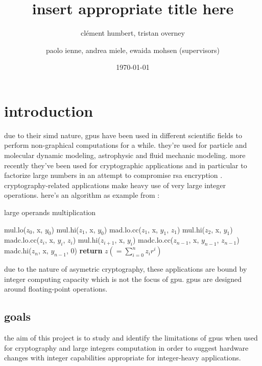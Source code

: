 \documentclass{report}
\begin{document}
\title{insert appropriate title here}
\author{cl\'{e}ment humbert, tristan overney\and paolo ienne, andrea miele, ewaida mohsen (supervisors)}
\date{\today}
\maketitle

\nocite{*}

\setcounter{tocdepth}{1}
\tableofcontents
\listoffigures

\chapter{introduction}

    due to their simd nature, gpus have been used in different scientific fields to perform
    non-graphical computations for a while. they're used for particle and molecular dynamic 
    modeling, astrophysic and fluid mechanic modeling.
    more recently they've been used for cryptographic applications and in particular
    to factorize large numbers in an attempt to compromise rsa encryption \cite{cofact14}.
    cryptography-related applications make heavy use of very large integer operations.
    here's an algorithm as example from \cite{cofact14}:
    \begin{algorithm}
    \caption{large operands multiplication}\label{mulalgo}
    \begin{algorithmic}[1]
        \state mul.lo($z_0$, x, $y_0$)
        \state mul.hi($z_1$, x, $y_0$)
        \state mad.lo.cc($z_1$, x, $y_1$, $z_1$)
        \state mul.hi($z_2$, x, $y_1$)
            \state madc.lo.cc($z_i$, x, $y_i$, $z_i$)
            \state mul.hi($z_{i+1}$, x, $y_i$)
        \endfor
        \state madc.lo.cc($z_{n-1}$, x, $y_{n-1}$, $z_{n-1}$)
        \state madc.hi($z_n$, x, $y_{n-1}$, 0)
        \state \textbf{return} $z (=\sum_{i=0}^nz_ir^i)$
    \end{algorithmic}
    \end{algorithm}

    due to the nature of asymetric cryptography, these applications are bound by
    integer computing capacity which is not the focus of gpu. gpus are designed
    around floating-point operations.

\section{goals}
    the aim of this project is to study and identify the limitations of gpus
    when used for cryptography and large integers computation in order to suggest
    hardware changes with integer capabilities appropriate for integer-heavy applications.
\end{document}
